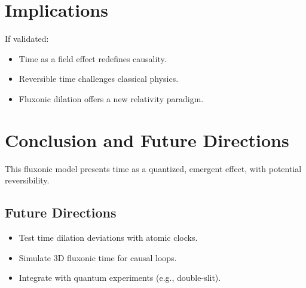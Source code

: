 \documentclass{article}
\begin{document}
\section{Implications}
If validated:
\begin{itemize}
    \item Time as a field effect redefines causality.
    \item Reversible time challenges classical physics.
    \item Fluxonic dilation offers a new relativity paradigm.
\end{itemize}

\section{Conclusion and Future Directions}
This fluxonic model presents time as a quantized, emergent effect, with potential reversibility.

\subsection{Future Directions}
\begin{itemize}
    \item Test time dilation deviations with atomic clocks.
    \item Simulate 3D fluxonic time for causal loops.
    \item Integrate with quantum experiments (e.g., double-slit).
\end{itemize}
\end{document}
